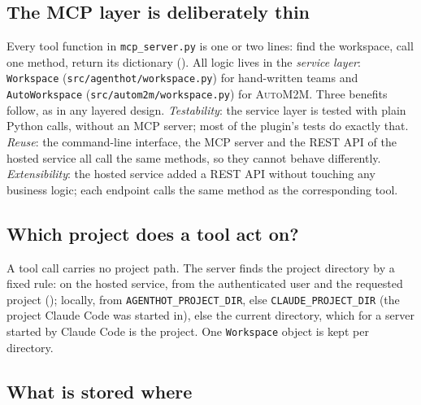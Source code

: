 \documentclass[10pt,a4paper]{article}
\newcommand{\auto}{\textsc{AutoM2M}}
\newcommand{\cc}{Claude Code}
\newcommand{\code}[1]{\texttt{#1}}
\newcommand{\file}[1]{\texttt{#1}}
\begin{document}
\subsection{The MCP layer is deliberately thin}

Every tool function in \file{mcp_server.py} is one or two lines: find the
workspace, call one method, return its dictionary (). All
logic lives in the \emph{service layer}: \code{Workspace}
(\file{src/agenthot/workspace.py}) for hand-written teams and
\code{AutoWorkspace} (\file{src/autom2m/workspace.py}) for \auto{}.
Three benefits follow, as in any layered design. \emph{Testability}: the
service layer is tested with plain Python calls, without an MCP server; most
of the plugin's tests do exactly that. \emph{Reuse}: the command-line
interface, the MCP server and the REST API of the hosted service all call
the same methods, so they cannot behave differently. \emph{Extensibility}:
the hosted service added a REST API without touching any business logic;
each endpoint calls the same method as the corresponding tool.

\subsection{Which project does a tool act on?}

A tool call carries no project path. The server finds the project directory
by a fixed rule: on the hosted service, from the authenticated user and the
requested project (); locally, from
\code{AGENTHOT\_PROJECT\_DIR}, else \code{CLAUDE\_PROJECT\_DIR} (the project
\cc{} was started in), else the current directory, which for a server
started by \cc{} is the project. One \code{Workspace} object is kept per
directory.

\subsection{What is stored where}
\end{document}
